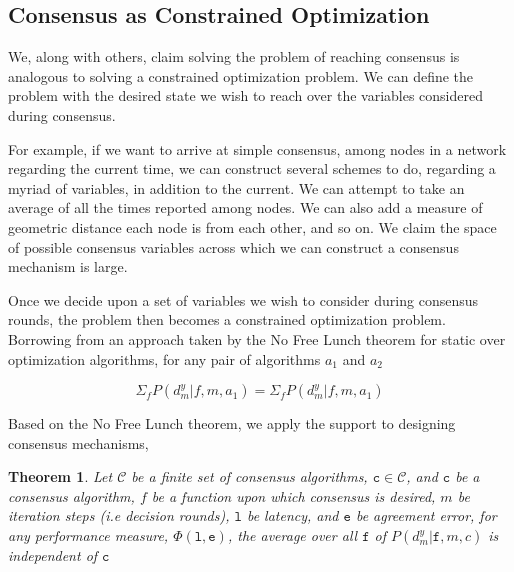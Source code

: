 \documentclass[12pt, titlepage, twocolumn]{report}
\newtheorem{theorem}{Theorem}
\begin{document}
\subsection{Consensus as Constrained Optimization}
We, along with others, claim solving the problem of reaching consensus is analogous to solving a constrained optimization problem. We can define the problem with the desired state we wish to reach over the variables considered during consensus.

For example, if we want to arrive at simple consensus, among nodes in a network regarding the current time, we can construct several schemes to do, regarding a myriad of variables, in addition to the current. We can attempt to take an average of all the times reported among nodes. We can also add a measure of geometric distance each node is from each other, and so on. We claim the space of possible consensus variables across which we can construct a consensus mechanism is large.

Once we decide upon a set of variables we wish to consider during consensus  rounds, the problem then becomes a constrained optimization problem. Borrowing from an approach taken by the No Free Lunch theorem for static over optimization algorithms, for any pair of algorithms \(a_1\) and \(a_2\) 

\begin{equation}
	\Sigma_f P(d^{y}_{m} \vert f, m, a_1) = \Sigma_f P(d^{y}_{m} \vert f, m, a_1) 
\end{equation}


Based on the No Free Lunch theorem, we apply the support to designing consensus mechanisms,


\begin{theorem}
	Let \( \mathcal{C} \) be a finite set of consensus algorithms, \( \texttt{c} \in \mathcal{C} \), and \(\texttt{c}\) be a consensus algorithm, \(f\) be a function upon which consensus is desired, \(m\) be iteration steps (i.e decision rounds), \(\texttt{l}\) be latency, and \( \texttt{e} \) be agreement error, for any performance measure, \( \Phi(\texttt{l}, \texttt{e}) \), the average over all \(\texttt{f}\) of \(P( d_{m}^{y} \vert \texttt{f}, m, c )\) is independent of \( \texttt{c} \)
\end{theorem}
\end{document}
